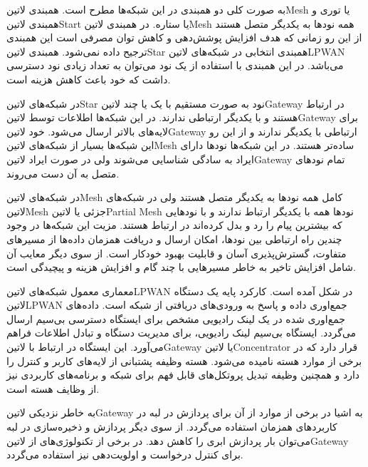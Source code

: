 
به صورت کلی دو همبندی در این شبکه‌ها مطرح است. همبندی ‌لاتین{Mesh} یا توری
و همبندی ‌لاتین{Start} یا ستاره.
در همبندی ‌لاتین{Mesh} همه نودها به یکدیگر متصل هستند از این رو زمانی که هدف
افزایش پوشش‌دهی و کاهش توان مصرفی است این همبندی ترجیح داده نمی‌شود. همبندی
‌لاتین{Star} همبندی انتخابی در شبکه‌های ‌لاتین{LPWAN} می‌باشد.
در این همبندی با استفاده از یک نود می‌توان به تعداد زیادی نود دسترسی داشت که
خود باعث کاهش هزینه است.

در شبکه‌های ‌لاتین{Star} نود به صورت مستقیم با یک یا چند ‌لاتین{Gateway} در ارتباط هستند
و با یکدیگر ارتباطی ندارند. در این شبکه‌ها اطلاعات توسط ‌لاتین{Gateway} برای لایه‌های بالاتر ارسال می‌شود.
خود ‌لاتین{Gateway} ارتباطی با یکدیگر ندارند و از این رو این شبکه‌ها بسیار از شبکه‌های ‌لاتین{Mesh} ساده‌تر هستند.
در این شبکه‌ها نودها دارای ایراد به سادگی شناسایی می‌شوند ولی در صورت ایراد ‌لاتین{Gateway} تمام نودهای
متصل به آن دست می‌روند.

در شبکه‌های ‌لاتین{Mesh} کامل همه نودها به یکدیگر متصل هستند ولی در شبکه‌های ‌لاتین{Mesh} جزئی یا ‌لاتین{Partial Mesh} نودها
همه با یکدیگر ارتباط ندارند و با نودهایی که بیشترین پیام را رد و بدل کرده‌اند در ارتباط هستند.
مزیت این شبکه‌ها در وجود چندین راه ارتباطی بین نودها، امکان ارسال و دریافت همزمان داده‌ها از مسیرهای متفاوت،
گسترش‌پذیری آسان و قابلیت بهبود خودکار است. از سوی دیگر معایب آن شامل افزایش تاخیر به خاطر مسیرهایی با چند گام و
افزایش هزینه و پیچیدگی است.


معماری معمول شبکه‌های ‌لاتین{LPWAN} در شکل  آمده است.
کارکرد پایه یک دستگاه ‌لاتین{LPWAN} جمع‌اوری داده و پاسخ به ورودی‌های دریافتی از شبکه است.
داده‌های جمع‌اوری شده در یک لینک رادیویی مشخص برای ایستگاه دسترسی بی‌سیم ارسال می‌گردد.
ایستگاه بی‌سیم لینک رادیویی، برای مدیریت دستگاه و تبادل اطلاعات فراهم می‌آورد.
این ایستگاه در ارتباط با ‌لاتین{Gateway} یا ‌لاتین{Concentrator} قرار دارد که در برخی از موارد هسته نامیده می‌شود.
هسته وظیفه پشتبانی از لایه‌های کاربر و کنترل را دارد و همچنین وظیفه تبدیل پروتکل‌های قابل فهم برای شبکه و برنامه‌های کاربردی نیز از وظایف هسته است.

به خاطر نزدیکی ‌لاتین{Gateway} به اشیا در برخی از موارد از آن برای پردازش در لبه در کاربردهای همزمان استفاده می‌گردد.
از سوی دیگر پردازش و ذخیره‌سازی در لبه می‌توان بار پردازش ابری را کاهش دهد. در برخی از تکنولوژی‌های
از ‌لاتین{Gateway} برای کنترل درخواست و اولویت‌دهی نیز استفاده می‌گردد.

